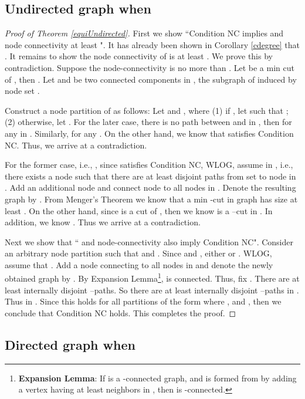 \documentclass[letterpaper, 11pt]{article}
\begin{document}
\subsection{Undirected graph when }
\begin{proof}[Proof of Theorem \ref{equiUndirected}]
First we show ``Condition NC implies  and node connectivity at least ". It has already been shown in Corollary \ref{cdegree} that . It remains to show the node connectivity of  is at least .
We prove this by contradiction. Suppose the node-connectivity is no more than . Let  be a min cut of , then .
Let  and  be two connected components in , the subgraph of  induced by node set .

Construct a node partition of  as follows:
Let  and , where (1) if , let  such that ; (2) otherwise, let .  For the later case, there is no path between  and  in , then  for any  in . Similarly,  for any . On the other hand, we know that  satisfies Condition NC. Thus, we arrive at a contradiction.

For the former case, i.e., , since  satisfies Condition NC, WLOG, assume  in , i.e., there exists a node  such that there are at least  disjoint paths from set  to node  in . Add an additional node  and connect node  to all nodes in .
Denote the resulting graph by .  From Menger's Theorem we know that a min -cut in graph  has size at least . On the other hand, since  is a cut of , then we know  is a --cut in . In addition, we know . Thus we arrive at a contradiction.




Next we show that `` and  node-connectivity also imply Condition NC". Consider an arbitrary node partition  such that  and . Since  and , either  or . WLOG, assume that . Add a node  connecting to all nodes in  and denote the newly obtained graph by . By Expansion Lemma\footnote{\textbf{Expansion Lemma}: If  is a -connected graph, and  is formed from  by adding a vertex  having at least  neighbors in , then  is -connected. },  is  connected. Thus, fix . There are at least  internally disjoint --paths. So there are at least  internally disjoint --paths in . Thus  in . Since this holds for all partitions of the form  where ,  and , then we conclude that Condition NC holds. This completes the proof.



\end{proof}

\subsection{Directed graph when }
\end{document}
